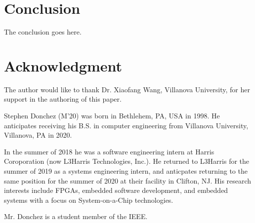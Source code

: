 \documentclass[journal]{IEEEtran}
\begin{document}
\section{Conclusion}
The conclusion goes here.

\section*{Acknowledgment}
The author would like to thank Dr. Xiaofang Wang, Villanova University, for her support in
the authoring of this paper.




\begin{IEEEbiography}
	{Stephen Donchez}
(M'20) was born in Bethlehem, PA, USA in 1998. He anticipates receiving his B.S. in
computer engineering from Villanova University, Villanova, PA in 2020.

In the summer of 2018 he was a software engineering intern at Harris Coroporation 
(now L3Harris Technologies, Inc.). He returned to L3Harris for the summer of 2019 as a 
systems engineering intern, and anticpates returning to the same position for the summer
of 2020 at their facility in Clifton, NJ. His research interests include FPGAs, embedded
software development, and embedded systems with a focus on System-on-a-Chip technologies.

Mr. Donchez is a student member of the IEEE.
\end{IEEEbiography}
\end{document}
